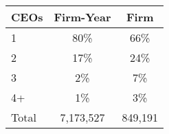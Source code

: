 \begin{tabular}{lcc}
\toprule
CEOs & Firm-Year & Firm \\
\midrule
1 & 80\% & 66\% \\
2 & 17\% & 24\% \\
3 & 2\% & 7\% \\
4+ & 1\% & 3\% \\
Total &    7,173,527 &      849,191 \\
\bottomrule
\end{tabular}
